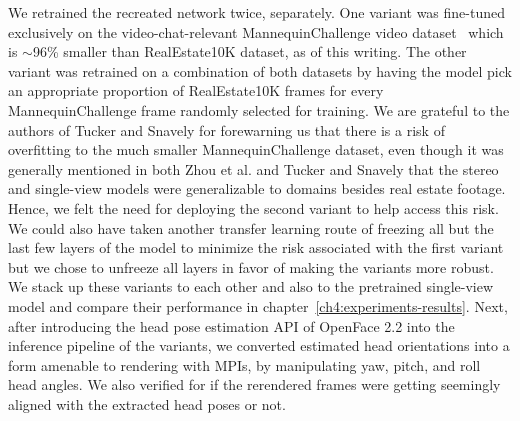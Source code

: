 We retrained the recreated network twice, separately. One variant was fine-tuned exclusively on the video-chat-relevant MannequinChallenge video dataset~\cite{li2019learning} which is $\sim$96\% smaller than RealEstate10K dataset, as of this writing. The other variant was retrained on a combination of both datasets by having the model pick an appropriate proportion of RealEstate10K frames for every MannequinChallenge frame randomly selected for training. We are grateful to the authors of Tucker and Snavely for forewarning us that there is a risk of overfitting to the much smaller MannequinChallenge dataset, even though it was generally mentioned in both Zhou et al. and Tucker and Snavely that the stereo and single-view models were generalizable to domains besides real estate footage. Hence, we felt the need for deploying the second variant to help access this risk. We could also have taken another transfer learning route of freezing all but the last few layers of the model to minimize the risk associated with the first variant but we chose to unfreeze all layers in favor of making the variants more robust. We stack up these variants to each other and also to the pretrained single-view model and compare their performance in chapter~\ref{ch4:experiments-results}. Next, after introducing the head pose estimation API of OpenFace 2.2 into the inference pipeline of the variants, we converted estimated head orientations into a form amenable to rendering with MPIs, by manipulating yaw, pitch, and roll head angles. We also verified for if the rerendered frames were getting seemingly aligned with the extracted head poses or not.




